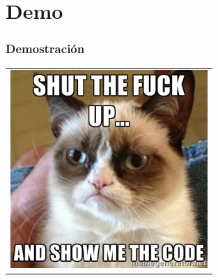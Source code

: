 \section{Demo}
\frame
{
\frametitle{Demostración}
{
\begin{table}[ht]
  \centering
  \begin{tabular}{c}
    \includegraphics[height=7.5cm]{imgs/demo.jpg}
  \end{tabular}
\end{table}
}
}
